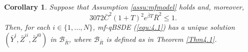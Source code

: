 \documentclass[10pt,a4paper]{article}
\newcommand{\be}{\begin{equation}}
\newcommand{\ee}{\end{equation}}
\newcommand{\bC}{\bar{C}}
\newcommand{\bR}{\bar{R}}
\theoremstyle{plain}
\newtheorem{Lemma}[Theorem]{Lemma}
\newtheorem{Corollary}[Theorem]{Corollary}
\theoremstyle{definition}
\numberwithin{equation}{section}
\begin{document}

\begin{Corollary}
\label{Cor4.5}
Suppose that Assumption \ref{assu:mfmodel} holds and, moreover,
\be\label{assu:modelbd1}
3072 \bC^{2}(1+T)^{2}e^{\bar{\beta} T} \bR^{2} \leq 1.
\ee
Then, for each $i \in \{1,...,N\}$, mf-qBSDE \textnormal{(\ref{equ:4.1})} has a unique solution $(\bar{Y}^{i},\bar{Z}^{ii},\bar{Z}^{i0})$ in $\mathcal{B}_{\bR}$, where $\mathcal{B}_{\bR}$ is defined as in Theorem \ref{Thm4.1}.
\end{Corollary}
 
\end{document}
